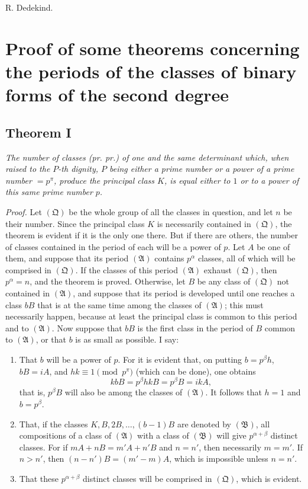 \documentclass[12pt]{article}
\begin{document}
\begin{flushright}
R. Dedekind.
\end{flushright}

\clearpage
\section*{Proof of some theorems concerning the periods of the classes of binary forms of the second degree}

\subsection*{Theorem I}

\emph{The number of classes (pr. pr.) of one and the same determinant which, when raised to the $P$-th dignity, $P$ being either a prime number or a power of a prime number $=p^\pi$, produce the principal class $K$, is equal either to $1$ or to a power of this same prime number $p$.}

\emph{Proof.} Let $(\mathfrak Q)$ be the whole group of all the classes in question, and let $n$ be their number. Since the principal class $K$ is necessarily contained in $(\mathfrak Q)$, the theorem is evident if it is the only one there. But if there are others, the number of classes contained in the period of each will be a power of $p$. Let $A$ be one of them, and suppose that its period $(\mathfrak A)$ contains $p^\alpha$ classes, all of which will be comprised in $(\mathfrak Q)$. If the classes of this period $(\mathfrak A)$ exhaust $(\mathfrak Q)$, then $p^\alpha=n$, and the theorem is proved. Otherwise, let $B$ be any class of $(\mathfrak Q)$ not contained in $(\mathfrak A)$, and suppose that its period is developed until one reaches a class $bB$ that is at the same time among the classes of $(\mathfrak A)$; this must necessarily happen, because at least the principal class is common to this period and to $(\mathfrak A)$. Now suppose that $bB$ is the first class in the period of $B$ common to $(\mathfrak A)$, or that $b$ is as small as possible. I say:

\begin{enumerate}[label=\arabic*\textsuperscript{o}.]
\item That $b$ will be a power of $p$. For it is evident that, on putting $b=p^\beta h$, $bB=iA$, and $hk\equiv 1\pmod {p^\pi}$ (which can be done), one obtains
\[
kbB=p^\beta hkB=p^\beta B=ikA,
\]
that is, $p^\beta B$ will also be among the classes of $(\mathfrak A)$. It follows that $h=1$ and $b=p^\beta$.

\item That, if the classes $K,B,2B,\ldots,(b-1)B$ are denoted by $(\mathfrak B)$, all compositions of a class of $(\mathfrak A)$ with a class of $(\mathfrak B)$ will give $p^{\alpha+\beta}$ distinct classes. For if $mA+nB=m'A+n'B$ and $n=n'$, then necessarily $m=m'$. If $n>n'$, then $(n-n')B=(m'-m)A$, which is impossible unless $n=n'$.

\item That these $p^{\alpha+\beta}$ distinct classes will be comprised in $(\mathfrak Q)$, which is evident.
\end{enumerate}
\end{document}
